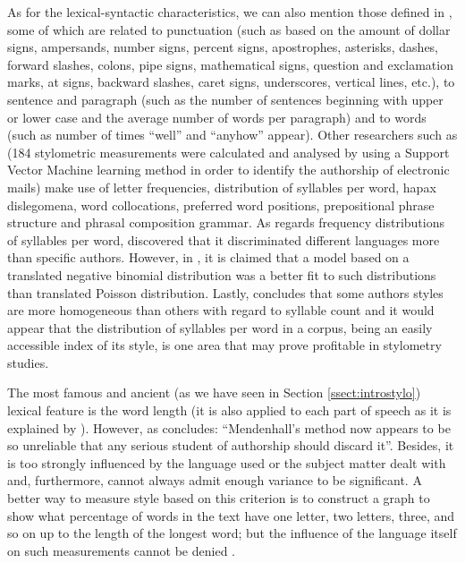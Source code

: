 As for the lexical-syntactic characteristics, we can also mention those defined in \cite{calix2008stylometry}, some of which are related to punctuation (such as based on the amount of dollar signs, ampersands, number signs, percent signs, apostrophes, asterisks, dashes, forward slashes, colons, pipe signs, mathematical signs, question and exclamation marks, at signs, backward slashes, caret signs, underscores, vertical lines, etc.), to sentence and paragraph (such as the number of sentences beginning with upper or lower case and the average number of words per paragraph) and to words (such as number of times ``well'' and ``anyhow'' appear). Other researchers such as \cite{corney2001identifying} (184 stylometric measurements were calculated and analysed by using a Support Vector Machine learning method in order to identify the authorship of electronic mails) make use of letter frequencies, distribution of syllables per word, hapax dislegomena, word collocations, preferred word positions, prepositional phrase structure and phrasal composition grammar. As regards frequency distributions of syllables per word, \cite{fucks1965mathematische} discovered that it discriminated different languages more than specific authors. However, in \cite{brainerd1974weighting}, it is claimed that a model based on a translated negative binomial distribution was a better fit to such distributions than \cite{fucks1965mathematische} translated Poisson distribution. Lastly, \cite{brainerd1974weighting} concludes that some authors styles are more homogeneous than others with regard to syllable count and it would appear that the distribution of syllables per word in a corpus, being an easily accessible index of its style, is one area that may prove profitable in stylometry studies.

The most famous and ancient (as we have seen in Section \ref{ssect:introstylo}) lexical feature is the word length (it is also applied to each part of speech as it is explained by \cite{allen1974methods}). However, as \cite{smith1983recent} concludes: ``Mendenhall's method now appears to be so unreliable that any serious student of authorship should discard it''. Besides, it is too strongly influenced by the language used or the subject matter dealt with and, furthermore, cannot always admit enough variance to be significant. A better way to measure style based on this criterion is to construct a graph to show what percentage of words in the text have one letter, two letters, three, and so on up to the length of the longest word; but the influence of the language itself on such measurements cannot be denied \citep{williams1970style}.

